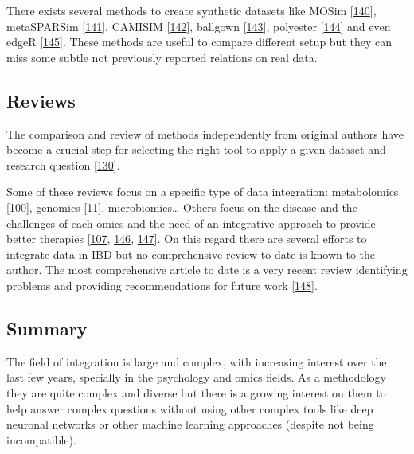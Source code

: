 \documentclass[
  12pt,
  a4paper,
  twoside,
  openright]{book}
\begin{document}
There exists several methods to create synthetic datasets like MOSim {[}\protect\hyperlink{ref-martuxednez-mira2018}{140}{]}, metaSPARSim {[}\protect\hyperlink{ref-patuzzi2019}{141}{]}, CAMISIM {[}\protect\hyperlink{ref-fritz2019}{142}{]}, ballgown {[}\protect\hyperlink{ref-fu2021}{143}{]}, polyester {[}\protect\hyperlink{ref-frazee2021}{144}{]} and even edgeR {[}\protect\hyperlink{ref-mccarthy2012}{145}{]}.
These methods are useful to compare different setup but they can miss some subtle not previously reported relations on real data.

\hypertarget{reviews}{%
\subsection{Reviews}\label{reviews}}

The comparison and review of methods independently from original authors have become a crucial step for selecting the right tool to apply a given dataset and research question {[}\protect\hyperlink{ref-cantini2021}{130}{]}.

Some of these reviews focus on a specific type of data integration: metabolomics {[}\protect\hyperlink{ref-cavill2016}{100}{]}, genomics {[}\protect\hyperlink{ref-mcgovern2015}{11}{]}, microbiomics\ldots{} Others focus on the disease and the challenges of each omics and the need of an integrative approach to provide better therapies {[}\protect\hyperlink{ref-tarazona2021}{107}, \protect\hyperlink{ref-de_souza_ibd_2017}{146}, \protect\hyperlink{ref-valles-colomer2016}{147}{]}.
On this regard there are several efforts to integrate data in \protect\hyperlink{acronyms_IBD}{IBD} but no comprehensive review to date is known to the author.
The most comprehensive article to date is a very recent review identifying problems and providing recommendations for future work {[}\protect\hyperlink{ref-sudhakar2022}{148}{]}.

\hypertarget{methods-integration}{%
\subsection{Summary}\label{methods-integration}}

The field of integration is large and complex, with increasing interest over the last few years, specially in the psychology and omics fields.
As a methodology they are quite complex and diverse but there is a growing interest on them to help answer complex questions without using other complex tools like deep neuronal networks or other machine learning approaches (despite not being incompatible).
\end{document}
